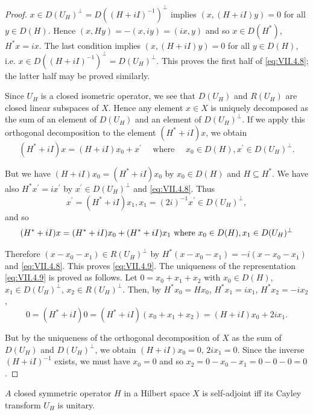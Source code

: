 \begin{proof}
 $x \in D(U_H)^\perp = D((H + iI)^{-1})^\perp$ implies $(x, (H + iI)y) = 0$ for all $y \in D(H)$. Hence $(x, Hy) = -(x, iy) = (ix, y)$ and so $x \in D(H^*)$, $H^*x = ix$. The last condition implies $(x, (H + iI)y) = 0$ for all $y \in D(H)$, i.e. $x \in D((H + iI)^{-1})^\perp = D(U_H)^\perp$. This proves the first half of \eqref{eq:VII.4.8}; the latter half may be proved similarly. 

Since $U_{H}$ is a closed isometric operator, we see that $D(U_{H})$ and $R(U_{H})$ are closed linear subspaces of $X$. Hence any element $x \in X$ is uniquely decomposed as the sum of an element of $D(U_{H})$ and an element of $D(U_{H})^{\perp}$. If we apply this orthogonal decomposition to the element $(H^{*} + iI)x$, we obtain 
\[
(H ^{*} + i I) x = (H + i I) x _{0} + x ^{\prime} \quad \text{ where } \quad x _{0} \in D (H), x ^{\prime} \in D (U _{H}) ^{\perp}.
\]

But we have $(H + iI)x_0 = (H^* +iI)x_0$ by $x_0\in D(H)$ and $H\subseteq H^{*}$. We have also $H^{*}x^{\prime} = ix^{\prime}$ by $x^{\prime}\in D(U_{H})^{\perp}$ and \eqref{eq:VII.4.8}. Thus 
\[
x ^{\prime} = (H ^{*} + i I) x _{1}, x _{1} = (2 i) ^{-1} x ^{\prime} \in D (U _{H}) ^{\perp},
\]
and so 
\begin{equation}(H ^{*} + i I) x = (H ^{*} + i I) x _{0} + (H ^{*} + i I) x _{1} \text{ where } x _{0} \in D (H), x _{1} \in D (U _{H}) ^{\perp} \notag\end{equation}

Therefore $(x - x_0 - x_1) \in R(U_H)^\perp$ by $H^*(x - x_0 - x_1) = -i(x - x_0 - x_1)$ and \eqref{eq:VII.4.8}. This proves \eqref{eq:VII.4.9}. The uniqueness of the representation \eqref{eq:VII.4.9} is proved as follows. Let $0 = x_0 + x_1 + x_2$ with $x_0 \in D(H)$, $x_1 \in D(U_H)^\perp$, $x_2 \in R(U_H)^\perp$. Then, by $H^* x_0 = Hx_0$, $H^* x_1 = ix_1$, $H^* x_2 = -ix_2$, 
\[
0 = \left(H ^{*} + i I\right) 0 = \left(H ^{*} + i I\right) \left(x _{0} + x _{1} + x _{2}\right) = (H + i I) x _{0} + 2 i x _{1}.
\]

But by the uniqueness of the orthogonal decomposition of $X$ as the sum of $D(U_{H})$ and $D(U_{H})^{\perp}$, we obtain $(H + iI)x_{0} = 0$, $2ix_{1} = 0$. Since the inverse $(H + iI)^{-1}$ exists, we must have $x_{0} = 0$ and so $x_{2} = 0 - x_{0} - x_{1} = 0 - 0 - 0 = 0$. 
\end{proof}

\begin{corollaryu} $A$ closed symmetric operator $H$ in a Hilbert space $X$ is self-adjoint iff its Cayley transform $U_{H}$ is unitary. 
\end{corollaryu}

